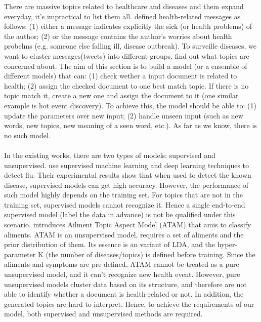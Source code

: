 \label{sec:uncoverig}
There are massive topics related to healthcare and diseases and them expand everyday, it's impractical to list them all. \cite{tuarob2013discovering} defined health-related messages as follows: (1) either a message indicates explicitly the sick (or health problems) of the author; (2) or the message contains the author's worries about health probelms (e.g. someone else falling ill, disease outbreak). To surveille diseases, we want to cluster messages(tweets) into different groups, find out what topics are concerned about. The aim of this section is to build a model (or a ensemble of different models) that can: (1) check wether a input document is related to health; (2) assign the checked document to one best match topic. If there is no topic match it, create a new one and assign the document to it (one similar example is hot event discovery). To achieve this, the model should be able to: (1) update the parameters over new input; (2) handle unseen input (such as new words, new topics, new meaning of a seen word, etc.). As far as we know, there is no such model.
\\\\
In the existing works, there are two types of models: supervised and unsupervised. \cite{serban2019real,aramaki2011twitter,lampos2010flu,chen2017disease} use supervised machine learning and deep learning techniques to detect flu. Their experimental results show that when used to detect the known disease, supervised models can get high accuracy. However, the performance of such model highly depends on the training set. For topics that are not in the training set, supervised models cannot recognize it. 
Hence a single end-to-end supervised model (label the data in advance) is not be qualified under this scenario. \cite{paul2012model} introduces Ailment Topic Aspect Model (ATAM) that amis to classify aliments. ATAM is an unsupervised model, requires a set of aliments and the prior distribution of them. Its essence is an variant of LDA, and the hyper-parameter K (the number of diseases/topics) is defined before training. Since the aliments and symptoms are pre-defined, ATAM cannot be treated as a pure unsupervised model, and it can't recognize new health event. However, pure unsupervised models cluster data based on its structure, and therefore are not able to identify whether a document is health-related or not. In addition, the generated topics are hard to interpret. Hence, to achieve the requirements of our model, both supervised and unsupervised methods are required.
\\\\
